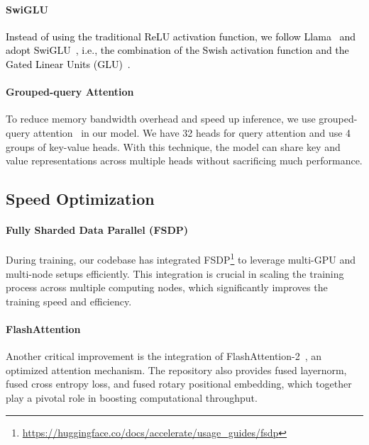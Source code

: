 \documentclass{article}
\begin{document}
\paragraph{SwiGLU} 
\textcolor{black}{
Instead of using the traditional ReLU activation function,
    we follow Llama~\citep{touvron2023llama,touvron2023llama2} and adopt SwiGLU~\citep{DBLP:journals/corr/abs-2002-05202},
    i.e., the combination of the Swish activation function and the Gated Linear Units (GLU)~\citep{dauphin2017glu}.
}
\vspace{-1em}
\paragraph{Grouped-query Attention} 
To reduce memory bandwidth overhead and speed up inference, we use grouped-query attention~\citep{DBLP:journals/corr/abs-2305-13245} in our model.
We have 32 heads for query attention and use 4 groups of key-value heads.
With this technique, the model can share key and value representations across multiple heads without sacrificing much performance.
\vspace{-1em}
\subsection{Speed Optimization}
\vspace{-0.5em}
\paragraph{Fully Sharded Data Parallel (FSDP)}
During training, our codebase has integrated FSDP\footnote{\url{https://huggingface.co/docs/accelerate/usage_guides/fsdp}} to leverage multi-GPU and multi-node setups efficiently. This integration is crucial in scaling the training process across multiple computing nodes, which significantly improves the training speed and efficiency.
\vspace{-1em}
\paragraph{FlashAttention} 
Another critical improvement is the integration of FlashAttention-2~\citep{dao2023fa2}, an optimized attention mechanism.
The repository also provides fused layernorm, fused cross entropy loss, and fused rotary positional embedding, which together play a pivotal role in boosting computational throughput.
\vspace{-1em}
\end{document}
